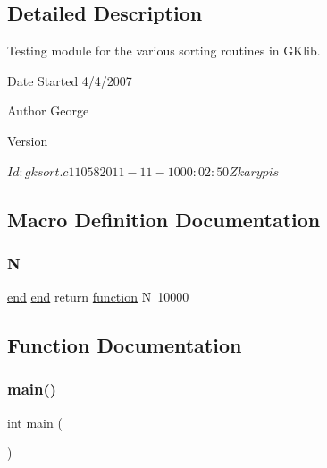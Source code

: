 \subsection{Detailed Description}
Testing module for the various sorting routines in G\+Klib. 

\begin{DoxyDate}{Date}
Started 4/4/2007 
\end{DoxyDate}
\begin{DoxyAuthor}{Author}
George 
\end{DoxyAuthor}
\begin{DoxyVersion}{Version}
\begin{DoxyVerb}$Id: gksort.c 11058 2011-11-10 00:02:50Z karypis $ \end{DoxyVerb}
 
\end{DoxyVersion}


\subsection{Macro Definition Documentation}
\mbox{\label{a00152_a73a9c02e249ae933af5b00aa8fd375a9}} 
\subsubsection{\texorpdfstring{N}{N}}
{\footnotesize\ttfamily \hyperlink{a00608_afb358f48b1646c750fb9da6c6585be2b}{end} \hyperlink{a00608_afb358f48b1646c750fb9da6c6585be2b}{end} return \hyperlink{a00611_a2420833d971716e9bab41cc9fb3abba1}{function} N~10000}



\subsection{Function Documentation}
\mbox{\label{a00152_ae66f6b31b5ad750f1fe042a706a4e3d4}} 
\subsubsection{\texorpdfstring{main()}{main()}}
{\footnotesize\ttfamily int main (\begin{DoxyParamCaption}{ }\end{DoxyParamCaption})}


